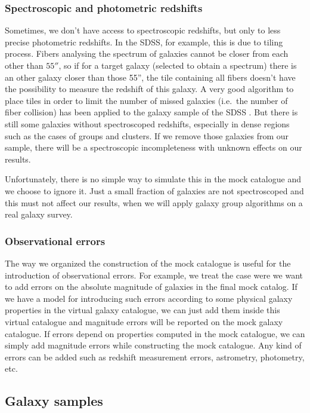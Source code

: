 \subsubsection{Spectroscopic and photometric redshifts}

Sometimes, we don't have access to spectroscopic redshifts, but only to less
precise photometric redshifts. In the SDSS, for example, this is due to tiling
process. Fibers analysing the spectrum of galaxies cannot be closer from each
other than $55''$, so if for a target galaxy (selected to obtain a spectrum)
there is an other galaxy closer than those 55'', the tile containing all fibers
doesn't have the possibility to measure the redshift of this galaxy. A very
good algorithm to place tiles in order to limit the number of missed galaxies
(i.e.\ the number of fiber collision) has been applied to the galaxy sample of
the SDSS \citep{Blanton+03}. But there is still some galaxies without
spectroscoped redshifts, especially in dense regions such as the cases of
groups and clusters. If we remove those galaxies from our sample, there
will be a spectroscopic incompleteness with unknown effects on our results.

Unfortunately, there is no simple way to simulate this in the mock catalogue
and we choose to ignore it. Just a small fraction of galaxies are not
spectroscoped and this must not affect our results, when we will apply galaxy
group algorithms on a real galaxy survey.

\subsubsection{Observational errors}

The way we organized the construction of the mock catalogue is useful for the
introduction of observational errors. For example, we treat the case were we
want to add errors on the absolute magnitude of galaxies in the final mock
catalog. If we have a model for introducing such errors according to some
physical galaxy properties in the virtual galaxy catalogue, we can just add them
inside this virtual catalogue and magnitude errors will be reported on the mock galaxy
catalogue. If errors depend on properties computed in the mock catalogue, we
can simply add magnitude errors while constructing the mock catalogue. Any
kind of errors can be added such as redshift measurement errors, astrometry,
photometry, etc.

\subsection{Galaxy samples}
\label{sub:galaxy_samples}

